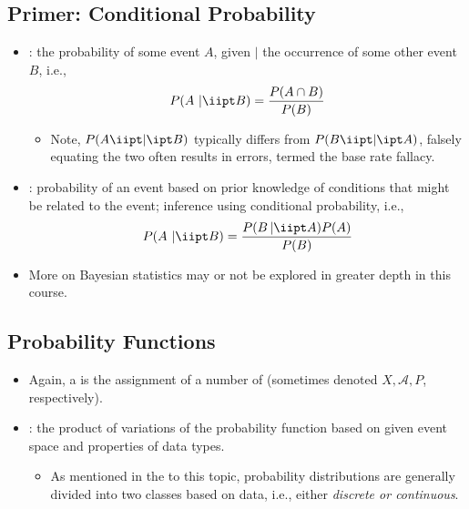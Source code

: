 \begin{itemize}
\begin{itemize}
  \end{itemize}
  
  \subsection{Primer: Conditional Probability}
  \begin{itemize}
    \item {}: the probability of some event \(A\), given \(|\) the occurrence of some other event \(B\), i.e.,
    \[%
    P(A~|\iipt B)=\frac{P(A\cap B)}{P(B)}
    \]%
    \begin{itemize}
      \item Note, \(P(A\iipt | \ipt B)\) typically differs from \(P(B \iipt | \ipt A)\), falsely equating the two often results in errors, termed the base rate fallacy.
    \end{itemize}
    \item {}: probability of an event based on prior knowledge of conditions that might be related to the event; inference using conditional probability, i.e.,
    \[%
    P(A~|\iipt B)=\frac{P(B\,|\iipt A)P(A)}{P(B)}
    \]%
    \item More on Bayesian statistics may or not be explored in greater depth in this course.
  \end{itemize}
  
  
  \subsection{Probability Functions}
  \begin{itemize}
    \item Again, a \hyperref[Section: Probability Fundamentals]{} is the assignment of a number of \hyperref[Section: Probability Fundamentals]{} (sometimes denoted \(X,\mathcal{A},P\), respectively). 
    \item {}: the product of  variations of the probability function based on given event space and properties of data types.
    \begin{itemize}
      \item As mentioned in the \hyperref[Subsection: Primer: Probability Distributions]{} to this topic, probability distributions are generally divided into two classes based on data, i.e., either \emph{discrete or continuous}.
    \end{itemize}
    

\end{itemize}
\end{itemize}
